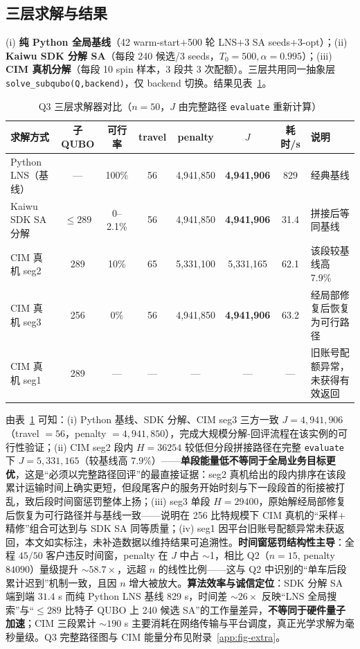 \documentclass[UTF8,12pt,a4paper]{ctexart}
\begin{document}
\subsection{三层求解与结果}
\label{subsec:q3-result}

(i) \textbf{纯 Python 全局基线}（42 warm-start$+$500 轮 LNS$+$3 SA seeds$+$3-opt）；(ii) \textbf{Kaiwu SDK 分解 SA}（每段 240 候选/3 seeds，$T_0=500,\alpha=0.995$）；(iii) \textbf{CIM 真机分解}（每段 10 spin 样本，3 段共 3 次配额）。三层共用同一抽象层 \texttt{solve\_subqubo(Q,backend)}，仅 backend 切换。结果见表~\ref{tab:q3-cmp}。

\begin{table}[H]
  \centering\footnotesize
  \caption{Q3 三层求解器对比（$n=50$，$J$ 由完整路径 \texttt{evaluate} 重新计算）}
  \label{tab:q3-cmp}
  \begin{tabular}{lccccccl}
    \toprule
    求解方式 & 子 QUBO & 可行率 & travel & penalty & $J$ & 耗时/s & 说明 \\
    \midrule
    Python LNS（基线） & --- & 100\% & 56 & 4{,}941{,}850 & \textbf{4{,}941{,}906} & 829 & 经典基线 \\
    Kaiwu SDK SA 分解 & $\le 289$ & 0--2.1\% & 56 & 4{,}941{,}850 & \textbf{4{,}941{,}906} & 31.4 & 拼接后等同基线 \\
    CIM 真机 seg2 & 289 & 10\% & 65 & 5{,}331{,}100 & 5{,}331{,}165 & 62.1 & 该段较基线高 7.9\% \\
    CIM 真机 seg3 & 256 & 0\% & 56 & 4{,}941{,}850 & \textbf{4{,}941{,}906} & 63.2 & 经局部修复后恢复为可行路径 \\
    CIM 真机 seg1 & 289 & --- & --- & --- & --- & --- & 旧账号配额异常，未获得有效返回 \\
    \bottomrule
  \end{tabular}
\end{table}

由表~\ref{tab:q3-cmp} 可知：(i) Python 基线、SDK 分解、CIM seg3 三方一致 $J=4{,}941{,}906$（travel $=56$，penalty $=4{,}941{,}850$），完成大规模分解-回评流程在该实例的可行性验证；(ii) CIM seg2 段内 $H=36254$ 较低但分段拼接路径在完整 \texttt{evaluate} 下 $J=5{,}331{,}165$（较基线高 $7.9\%$）——\textbf{单段能量低不等同于全局业务目标更优}，这是``必须以完整路径回评''的最直接证据：seg2 真机给出的段内排序在该段累计运输时间上确实更短，但段尾客户的服务开始时刻与下一段段首的衔接被打乱，致后段时间窗惩罚整体上扬；(iii) seg3 单段 $H=29400$，原始解经局部修复后恢复为可行路径并与基线一致——说明在 256 比特规模下 CIM 真机的``采样$+$精修''组合可达到与 SDK SA 同等质量；(iv) seg1 因平台旧账号配额异常未获返回，本文如实标注，未补造数据以维持结果可追溯性。\textbf{时间窗惩罚结构性主导}：全程 $45/50$ 客户违反时间窗，penalty 在 $J$ 中占 $\sim$1，相比 Q2（$n\!=\!15$, penalty $84090$）量级提升 $\sim 58.7\times$，远超 $n$ 的线性比例——这与 Q2 中识别的``单车后段累计迟到''机制一致，且因 $n$ 增大被放大。\textbf{算法效率与诚信定位}：SDK 分解 SA 端到端 $31.4$ s 而纯 Python LNS 基线 829 s，时间差 $\sim 26\!\times$ 反映``LNS 全局搜索''与``$\le 289$ 比特子 QUBO 上 240 候选 SA''的工作量差异，\textbf{不等同于硬件量子加速}；CIM 三段累计 $\sim 190$ s 主要消耗在网络传输与平台调度，真正光学求解为毫秒量级。Q3 完整路径图与 CIM 能量分布见附录~\ref{app:fig-extra}。
\end{document}
